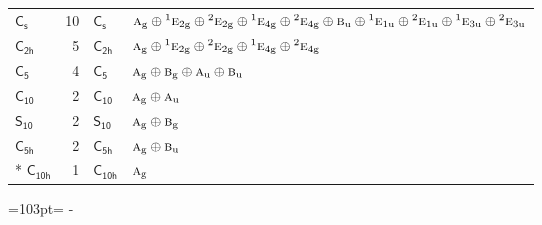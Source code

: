 \documentclass[10pt,a4paper]{article}
\newcommand{\needspace}[1]{\par\penalty-100\begingroup\dimen0=#1\relax\dimen2=\pagegoal
  \advance\dimen2-\pagetotal\ifdim\dimen0>\dimen2\relax\ifdim\dimen2>0pt\vfil\break\fi\fi
  \endgroup}
\numberwithin{equation}{section}
\newcommand{\grp}[1]{\mathsf{#1}}
\newcommand{\irr}[1]{\text{\normalfont\scshape #1}}
\newcommand{\conjpair}[1]{{}^{#1}}
\newcommand{\ptag}[1]{\mathrm{#1}}
\newlength{\fillwidth}\newlength{\cellwidth}\newlength{\colwidth}
\begin{document}
{\begin{longtable}{@{}lrl>{\RaggedRight\arraybackslash}p{\fillwidth}@{}}
\href{C1v.pdf}{$\grp{C_{s}}$} & 10 & \href{C1v.pdf}{$\grp{C_{s}}$} & $\irr{a}_{\ptag{g}}\oplus \conjpair{1}\irr{e}_{2\ptag{g}}\oplus \conjpair{2}\irr{e}_{2\ptag{g}}\oplus \conjpair{1}\irr{e}_{4\ptag{g}}\oplus \conjpair{2}\irr{e}_{4\ptag{g}}\oplus \irr{b}_{\ptag{u}}\oplus \conjpair{1}\irr{e}_{1\ptag{u}}\oplus \conjpair{2}\irr{e}_{1\ptag{u}}\oplus \conjpair{1}\irr{e}_{3\ptag{u}}\oplus \conjpair{2}\irr{e}_{3\ptag{u}}$\\
\href{C2h.pdf}{$\grp{C_{2h}}$} & 5 & \href{C2h.pdf}{$\grp{C_{2h}}$} & $\irr{a}_{\ptag{g}}\oplus \conjpair{1}\irr{e}_{2\ptag{g}}\oplus \conjpair{2}\irr{e}_{2\ptag{g}}\oplus \conjpair{1}\irr{e}_{4\ptag{g}}\oplus \conjpair{2}\irr{e}_{4\ptag{g}}$\\
\href{C5.pdf}{$\grp{C_{5}}$} & 4 & \href{C5.pdf}{$\grp{C_{5}}$} & $\irr{a}_{\ptag{g}}\oplus \irr{b}_{\ptag{g}}\oplus \irr{a}_{\ptag{u}}\oplus \irr{b}_{\ptag{u}}$\\
\href{C10.pdf}{$\grp{C_{10}}$} & 2 & \href{C10.pdf}{$\grp{C_{10}}$} & $\irr{a}_{\ptag{g}}\oplus \irr{a}_{\ptag{u}}$\\
\href{S10.pdf}{$\grp{S_{10}}$} & 2 & \href{S10.pdf}{$\grp{S_{10}}$} & $\irr{a}_{\ptag{g}}\oplus \irr{b}_{\ptag{g}}$\\
\href{C5h.pdf}{$\grp{C_{5h}}$} & 2 & \href{C5h.pdf}{$\grp{C_{5h}}$} & $\irr{a}_{\ptag{g}}\oplus \irr{b}_{\ptag{u}}$\\*
\href{C10h.pdf}{$\grp{C_{10h}}$} & 1 & \href{C10h.pdf}{$\grp{C_{10h}}$} & $\irr{a}_{\ptag{g}}$\\
\bottomrule\end{longtable}}
\needspace{103pt}
\end{document}
